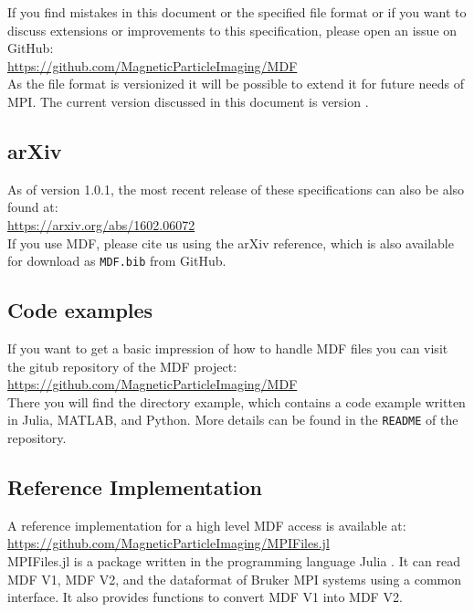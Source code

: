 \documentclass[landscape,a4paper]{article} %
\newcommand{\inlvar}[1]{{\ttfamily#1}}
\begin{document}
\begin{multicols}{2}
If you find mistakes in this document or the specified file format or if you want to discuss extensions or improvements to this specification, please open an issue on GitHub:\\
\hspace*{1cm}\url{https://github.com/MagneticParticleImaging/MDF}\\
As the file format is versionized it will be possible to extend it for future needs of MPI. The current version discussed in this document is version \version.

\subsection{arXiv}
As of version 1.0.1, the most recent release of these specifications can also be also found at:\\
\hspace*{1cm}\url{https://arxiv.org/abs/1602.06072}\\
If you use MDF, please cite us using the arXiv reference, which is also available for download as \texttt{MDF.bib} from GitHub.


\subsection{Code examples}		 
  		  
If you want to get a basic impression of how to handle MDF files you can visit the gitub repository of the MDF project:\\		
  \hspace*{1cm}\url{https://github.com/MagneticParticleImaging/MDF}\\	
There you will find the directory example, which contains a code example written in Julia, MATLAB, and Python. More details can be found in the \texttt{README} of the repository.
 
\subsection{Reference Implementation}		 

A reference implementation for a high level MDF access is available at:\\
  \hspace*{1cm}\url{https://github.com/MagneticParticleImaging/MPIFiles.jl}\\	
\inlvar{MPIFiles.jl} is a package written in the programming language Julia \cite{Bezanson2012,Bezanson2014,Bezanson2014a}. It can read MDF V1, MDF V2, and the dataformat of Bruker MPI systems using a common interface. It also provides  functions to convert MDF V1 into MDF V2.

\end{multicols}
\end{document}
